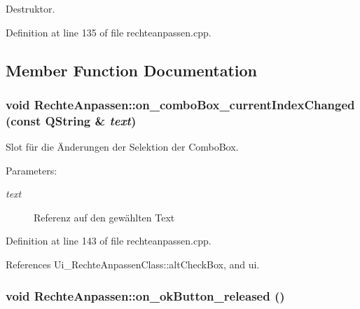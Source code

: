Destruktor. 



Definition at line 135 of file rechteanpassen.cpp.

\subsection{Member Function Documentation}
\hypertarget{class_rechte_anpassen_780aca60ab029d93d65f3a61804b68a6}{
\subsubsection[on\_\-comboBox\_\-currentIndexChanged]{\setlength{\rightskip}{0pt plus 5cm}void RechteAnpassen::on\_\-comboBox\_\-currentIndexChanged (const QString \& {\em text})}}
\label{class_rechte_anpassen_780aca60ab029d93d65f3a61804b68a6}


Slot für die Änderungen der Selektion der ComboBox. 

\begin{Desc}
\item[Parameters:]
\begin{description}
\item[{\em text}]Referenz auf den gewählten Text \end{description}
\end{Desc}


Definition at line 143 of file rechteanpassen.cpp.

References Ui\_\-RechteAnpassenClass::altCheckBox, and ui.\hypertarget{class_rechte_anpassen_511148f4cd870c9b42addd4eeb60f799}{
\subsubsection[on\_\-okButton\_\-released]{\setlength{\rightskip}{0pt plus 5cm}void RechteAnpassen::on\_\-okButton\_\-released ()}}
\label{class_rechte_anpassen_511148f4cd870c9b42addd4eeb60f799}


